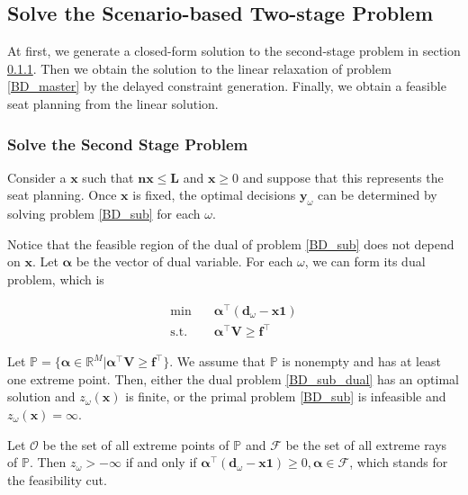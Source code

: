 \subsection{Solve the Scenario-based Two-stage Problem}\label{solve_by_benders}
At first, we generate a closed-form solution to the second-stage problem in section \ref{second_stage}. Then we obtain the solution to the linear relaxation of problem \eqref{BD_master} by the delayed constraint generation. Finally, we obtain a feasible seat planning from the linear solution.


\subsubsection{Solve the Second Stage Problem}\label{second_stage}

Consider a $\mathbf{x}$ such that $\mathbf{n x} \leq \mathbf{L}$ and $\mathbf{x} \geq 0$ and suppose that this represents the seat planning. Once $\mathbf{x}$ is fixed, the optimal decisions $\mathbf{y}_{\omega}$ can be determined by solving problem \eqref{BD_sub} for each $\omega$.

Notice that the feasible region of the dual of problem \eqref{BD_sub} does not depend on $\mathbf{x}$. Let $\bm{\alpha}$ be the vector of dual variable. For each $\omega$, we can form its dual problem, which is 

\begin{equation}\label{BD_sub_dual}
  \begin{aligned}
    \min \quad & \bm{\alpha}^{\intercal} (\mathbf{d}_{\omega}- \mathbf{x} \mathbf{1}) \\
    \text {s.t.} \quad & \bm{\alpha}^{\intercal} \mathbf{V} \geq \mathbf{f}^{\intercal}
  \end{aligned}
  \end{equation}

Let $\mathbb{P} = \{\bm{\alpha} \in \mathbb{R}^{M}|\bm{\alpha}^{\intercal} \mathbf{V} \geq \mathbf{f}^{\intercal}\}$. 
We assume that $\mathbb{P}$ is nonempty and has at least one extreme point. Then, either the dual problem \eqref{BD_sub_dual} has an optimal solution and $z_{\omega}(\mathbf{x})$ is finite, or the primal problem \eqref{BD_sub} is infeasible and $z_{\omega}(\mathbf{x}) = \infty$.  

Let $\mathcal{O}$ be the set of all extreme points of $\mathbb{P}$ and $\mathcal{F}$ be the set of all extreme rays of $\mathbb{P}$. Then $z_{\omega} > -\infty$ if and only if $\bm{\alpha}^{\intercal}(\mathbf{d}_{\omega}- \mathbf{x} \mathbf{1}) \geq 0, \bm{\alpha} \in \mathcal{F}$, which stands for the feasibility cut.

